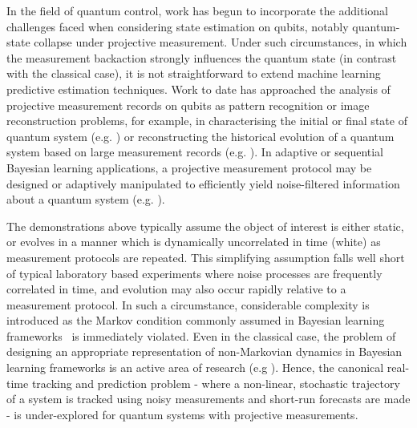In the field of quantum control, work has begun to incorporate the additional challenges faced when considering state estimation on qubits, notably quantum-state collapse under projective measurement.  Under such circumstances, in which the measurement backaction strongly influences the quantum state (in contrast with the classical case), it is not straightforward to extend machine learning predictive estimation techniques.  Work to date has approached the analysis of projective measurement records on qubits as pattern recognition or image reconstruction problems, for example, in characterising the initial or final state of quantum system (e.g. \cite{struchalin2016experimental, sergeevich2011characterization, mahler2013adaptive}) or reconstructing the historical evolution of a quantum system based on large measurement records (e.g. \cite{stenberg2016characterization, shabani2011efficient, shen2014reconstructing, de2016estimation, tan2015prediction, huang2017neural}). In adaptive or sequential Bayesian learning applications, a projective measurement protocol may be designed or adaptively manipulated to efficiently yield noise-filtered information about a quantum system (e.g. \cite{bonato2016optimized, wiebe2015bayesian}). 

The demonstrations above typically assume the object of interest is either static, or evolves in a manner which is dynamically uncorrelated in time (white) as measurement protocols are repeated. This simplifying assumption falls well short of typical laboratory based experiments where noise processes are frequently correlated in time, and evolution may also occur rapidly relative to a measurement protocol. In such a circumstance, considerable complexity is introduced as the Markov condition commonly assumed in Bayesian learning frameworks~\cite{candy2016bayesian} is immediately violated.  Even in the classical case, the problem of designing an appropriate representation of non-Markovian dynamics in Bayesian learning frameworks is an active area of research (e.g  \cite{jacob2017bayesian}).  Hence, the canonical real-time tracking and prediction problem - where a non-linear, stochastic trajectory of a system is tracked using noisy measurements and short-run forecasts are made - is under-explored for quantum systems with projective measurements.

